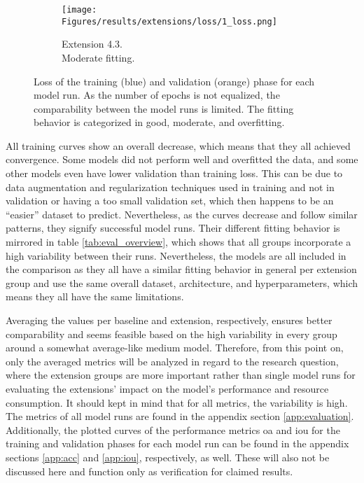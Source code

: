 \begin{figure}[!hp]
\begin{subfigure}{.325\textwidth}
    \end{subfigure}
    \begin{subfigure}{.325\textwidth}
        \centering
        \texttt{[image: Figures/results/extensions/loss/1\_loss.png]}
        \caption{Extension 4.3.\\Moderate fitting.}
    \end{subfigure}
    \caption[Loss Plots of Model Runs]{Loss of the training (blue) and validation (orange) phase for each model run. As the number of epochs is not equalized, the comparability between the model runs is limited. The fitting behavior is categorized in good, moderate, and overfitting.}
    \label{fig:losses}
\end{figure}

All training curves show an overall decrease, which means that they all achieved convergence. Some models did not perform well and overfitted the data, and some other models even have lower validation than training loss. This can be due to data augmentation and regularization techniques used in training and not in validation or having a too small validation set, which then happens to be an \enquote{easier} dataset to predict. Nevertheless, as the curves decrease and follow similar patterns, they signify successful model runs. Their different fitting behavior is mirrored in table \ref{tab:eval_overview}, which shows that all groups incorporate a high variability between their runs. Nevertheless, the models are all included in the comparison as they all have a similar fitting behavior in general per extension group and use the same overall dataset, architecture, and hyperparameters, which means they all have the same limitations.

Averaging the values per baseline and extension, respectively, ensures better comparability and seems feasible based on the high variability in every group around a somewhat average-like medium model. Therefore, from this point on, only the averaged metrics will be analyzed in regard to the research question, where the extension groups are more important rather than single model runs for evaluating the extensions' impact on the model's performance and resource consumption. It should kept in mind that for all metrics, the variability is high. The metrics of all model runs are found in the appendix section \ref{app:evaluation}. Additionally, the plotted curves of the performance metrics \gls{oa} and \gls{iou} for the training and validation phases for each model run can be found in the appendix sections \ref{app:acc} and \ref{app:iou}, respectively, as well. These will also not be discussed here and function only as verification for claimed results.

